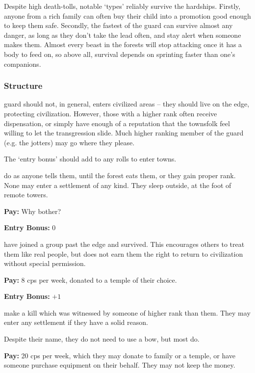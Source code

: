\begin{multicols}{2}
Despite high death-tolls, notable `types' reliably survive the hardships.
Firstly, anyone from a rich family can often buy their child into a promotion good enough to keep them safe.
Secondly, the fastest of the \gls{guard} can survive almost any danger, as long as they don't take the lead often, and stay alert when someone makes them.
Almost every beast in the forests will stop attacking once it has a body to feed on, so above all, survival depends on sprinting faster than one's companions.

\subsubsection{Structure}

\Gls{guard} should not, in general, enters civilized areas -- they should live on the \gls{edge}, protecting civilization.
However, those with a higher rank often receive dispensation, or simply have enough of a reputation that the townsfolk feel willing to let the transgression slide.
Much higher ranking member of the \gls{guard} (e.g. the \glspl{jotter}) may go where they please.

The `entry bonus' should add to any rolls to enter towns.

\begin{description}
  \label{fodder}%
  do as anyone tells them, until the forest eats them, or they gain proper rank.
  None may enter a settlement of any kind.
  They sleep outside, at the foot of remote towers.

  \textbf{Pay:} Why bother?

  \textbf{Entry Bonus:} $0$

  have joined a group past the \gls{edge} and survived.
  This encourages others to treat them like real people, but does not earn them the right to return to civilization without special permission.

  \textbf{Pay:} 8 \glspl{cp} per week, donated to a temple of their choice.

  \textbf{Entry Bonus:} $+1$

  make a kill which was witnessed by someone of higher rank than them.
  They may enter any settlement if they have a solid reason.

  Despite their name, they do not need to use a bow, but most do.

  \textbf{Pay:} 20 \glspl{cp} per week, which they may donate to family or a temple, or have someone purchase equipment on their behalf.
  They may not keep the money.


\end{description}
\end{multicols}
